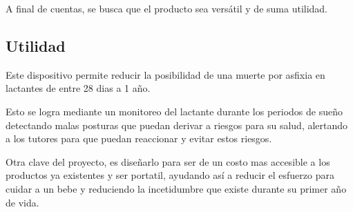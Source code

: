 A final de cuentas, se busca que el producto sea versátil y de suma utilidad.

\subsection{Utilidad}
Este dispositivo permite reducir la posibilidad de una muerte por asfixia en lactantes de entre 28 dias a 1 año.

Esto se logra mediante un monitoreo del lactante durante los periodos de sueño detectando malas posturas que puedan derivar a riesgos para su salud, alertando a los tutores para que puedan reaccionar y evitar estos riesgos.

Otra clave del proyecto, es diseñarlo para ser de un costo mas accesible a los productos ya existentes y ser portatil, ayudando así a reducir el esfuerzo para cuidar a un bebe y reduciendo la incetidumbre que existe durante su primer año de vida.
